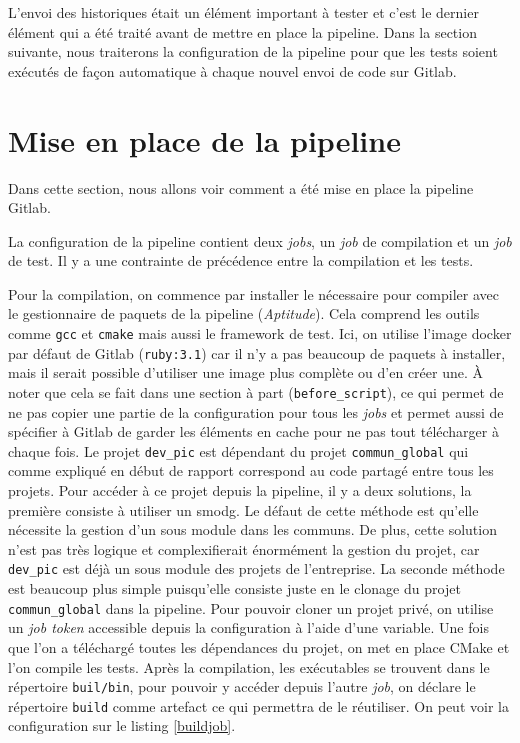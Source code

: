 \documentclass[a4paper]{article}
\begin{document}
L'envoi des historiques était un élément important à tester et c'est le dernier
élément qui a été traité avant de mettre en place la pipeline. Dans la section
suivante, nous traiterons la configuration de la pipeline pour que les tests
soient exécutés de façon automatique à chaque nouvel envoi de code sur Gitlab.
\section{Mise en place de la pipeline}%

Dans cette section, nous allons voir comment a été mise en place la pipeline
Gitlab.

La configuration de la pipeline contient deux \textit{jobs}, un \textit{job} de
compilation et un \textit{job} de test. Il y a une contrainte de précédence
entre la compilation et les tests.

Pour la compilation, on commence par installer le nécessaire pour compiler avec
le gestionnaire de paquets de la pipeline (\textit{Aptitude}). Cela comprend les
outils comme \verb|gcc| et \verb|cmake| mais aussi le framework de test. Ici, on
utilise l'image docker par défaut de Gitlab (\verb|ruby:3.1|) car il n'y a pas
beaucoup de paquets à installer, mais il serait possible d'utiliser une image
plus complète ou d'en créer une. À noter que cela se fait dans une section à
part (\verb|before_script|), ce qui permet de ne pas copier une partie de la
configuration pour tous les \textit{jobs} et permet aussi de spécifier à Gitlab
de garder les éléments en cache pour ne pas tout télécharger à chaque fois. Le
projet \verb|dev_pic| est dépendant du projet \verb|commun_global| qui comme
expliqué en début de rapport correspond au code partagé entre tous les projets.
Pour accéder à ce projet depuis la pipeline, il y a deux solutions, la première
consiste à utiliser un \gls{smodg}. Le défaut de cette méthode est qu'elle
nécessite la gestion d'un sous module dans les communs. De plus, cette solution
n'est pas très logique et complexifierait énormément la gestion du projet, car
\verb|dev_pic| est déjà un sous module des projets de l'entreprise. La seconde
méthode est beaucoup plus simple puisqu'elle consiste juste en le clonage du
projet \verb|commun_global| dans la pipeline. Pour pouvoir cloner un projet
privé, on utilise un \textit{job token} accessible depuis la configuration à
l'aide d'une variable. Une fois que l'on a téléchargé toutes les dépendances du
projet, on met en place CMake et l'on compile les tests. Après la compilation, les
exécutables se trouvent dans le répertoire \verb|buil/bin|, pour pouvoir y
accéder depuis l'autre \textit{job}, on déclare le répertoire \verb|build| comme
artefact ce qui permettra de le réutiliser. On peut voir la configuration sur le
listing \ref{buildjob}.
\end{document}
